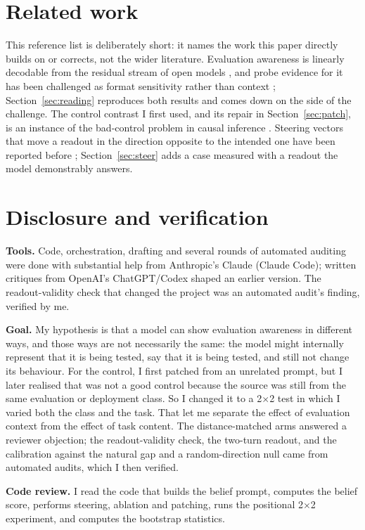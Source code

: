 \documentclass[10pt]{article}
\begin{document}
\section{Related work}

This reference list is deliberately short: it names the work this paper
directly builds on or corrects, not the wider literature. Evaluation
awareness is linearly decodable from the residual stream of open models
\citep{nguyen2025probing}, and probe evidence for it has been challenged as
format sensitivity rather than context \citep{devbunova2026format};
Section~\ref{sec:reading} reproduces both results and comes down on the side
of the challenge. The control contrast I first used, and its repair in
Section~\ref{sec:patch}, is an instance of the bad-control problem in causal
inference \citep{cinelli2022crash}. Steering vectors that move a readout in
the direction opposite to the intended one have been reported before
\citep{torop2026inverted}; Section~\ref{sec:steer} adds a case measured with
a readout the model demonstrably answers.

\section{Disclosure and verification}\label{sec:disclosure}
\textbf{Tools.} Code, orchestration, drafting and several rounds of
automated auditing were done with substantial help from Anthropic's Claude
(Claude Code); written critiques from OpenAI's ChatGPT/Codex shaped an earlier
version. The readout-validity check that changed the project was an
automated audit's finding, verified by me.

\textbf{Goal.} My hypothesis is that a model can show
evaluation awareness in different ways, and those ways are not necessarily
the same: the model might internally represent that it is being tested, say
that it is being tested, and still not change its behaviour. For the control,
I first patched from an unrelated prompt, but I later realised that was not a
good control because the source was still from the same evaluation or
deployment class. So I changed it to a 2$\times$2 test in which I varied both
the class and the task. That let me separate the effect of evaluation context
from the effect of task content. The distance-matched arms answered a
reviewer objection; the readout-validity check, the two-turn readout, and the
calibration against the natural gap and a random-direction null came from
automated audits, which I then verified.

\textbf{Code review.} I read the code that builds the belief prompt,
computes the belief score, performs steering, ablation and patching, runs the
positional 2$\times$2 experiment, and computes the bootstrap statistics.
\end{document}
